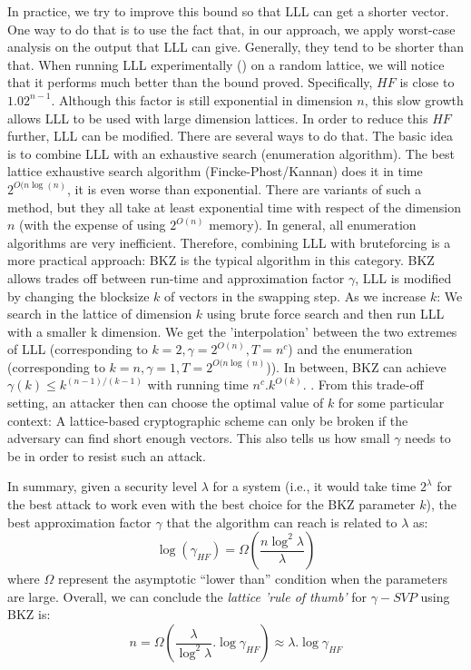In practice, we try to improve this bound so that LLL can get a shorter vector. One way
to do that is to use the fact that, in our approach, we apply worst-case analysis
on the output that LLL can give. Generally, they tend to be shorter than
that. When running LLL experimentally (\cite{nguyen2006lll}) on a random lattice, we
will notice that it performs much better than the bound proved. Specifically, $HF$
is close to $1.02^{n-1}$. Although this factor is still exponential in dimension
$n$, this slow growth allows LLL to be used with large dimension lattices. In
order to reduce this $HF$ further, LLL can be modified. There are several
ways to do that. The basic idea is to combine LLL with an exhaustive search
(enumeration algorithm). The best lattice exhaustive search algorithm
(Fincke-Phost/Kannan) does it in time $2^{O(n\log(n)}$, it is even worse than
exponential. There are variants of such a method, but they all take at least
exponential time with respect of the dimension $n$ (with the expense of using $2^{O(n)}$
memory). In general, all enumeration algorithms are very inefficient. Therefore,
combining LLL with bruteforcing is a more practical approach: BKZ is the typical
algorithm in this category.  BKZ allows trades off between run-time and
approximation factor $\gamma$, LLL is modified by changing the blocksize $k$ of
vectors in the swapping step. As we increase $k$: We search in the lattice of
dimension $k$ using brute force search and then run LLL with a smaller k dimension. We get the 'interpolation' between the two extremes of LLL (corresponding to
$k = 2, \gamma = 2^{O(n)}, T = n^c$) and the enumeration (corresponding to
$k = n, \gamma=1, T = 2^{O(n\log(n)}$)). In between, BKZ can achieve
$\gamma(k) \leq k^{(n-1)/(k-1)}$ with running time
$n^c.k^{O(k)}$. \cite{hanrot2011terminating}. From this trade-off setting, an
attacker then can choose the optimal value of $k$ for some particular context: A
lattice-based cryptographic scheme can only be broken if the adversary can find
short enough vectors. This also tells us how small $\gamma$ needs to be in order
to resist such an attack.

In summary, given a security level $\lambda$ for a system (i.e., it would take
time $2^\lambda$ for the best attack to work even with the best choice for the BKZ
parameter $k$), the best approximation factor $\gamma$ that the
algorithm can reach is related to $\lambda$ as:
\[
  \log(\gamma_{HF}) = \Omega(\frac{n\log^2\lambda}{\lambda})
\]
where $\Omega$ represent the asymptotic ``lower than'' condition when the parameters
are large. Overall, we can conclude the \emph{lattice 'rule of thumb'} for
$\gamma-SVP$ using BKZ is:
\[
  n = \Omega(\frac{\lambda}{\log^2\lambda}.\log\gamma_{HF}) \approx \lambda
  . \log\gamma_{HF}
\]

